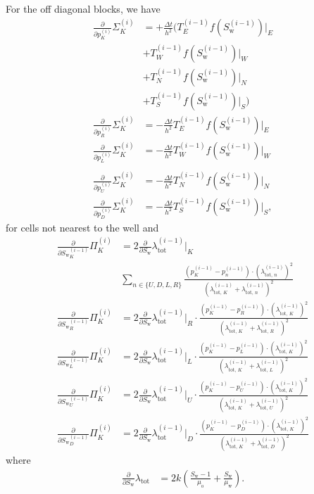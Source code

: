 \documentclass[conference]{IEEEtran}
\newcommand*{\pdiff}[2]{\ensuremath{\frac{\partial}{\partial{#2}}{#1}}}
\begin{document}
For the off diagonal blocks, we have
\begin{align}
\pdiff{\Sigma_K^{(i)}}{p_K^{(i)}} &= +\frac{\Delta t}{h^2} \biggr(T_E^{(i-1)} f(S_\text{w}^{(i-1)})\lvert_E \\&+ T_W^{(i-1)} f(S_\text{w}^{(i-1)})\lvert_W \nonumber\\&+ T_N^{(i-1)} f(S_\text{w}^{(i-1)})\lvert_N \nonumber\\&+T_S^{(i-1)}  f(S_\text{w}^{(i-1)})\lvert_S\biggr) \nonumber\\
\pdiff{\Sigma_K^{(i)}}{p_R^{(i)}} &= -\frac{\Delta t}{h^2}T_E^{(i-1)} f(S_\text{w}^{(i-1)})\lvert_E \\
\pdiff{\Sigma_K^{(i)}}{p_L^{(i)}} &= -\frac{\Delta t}{h^2}T_W^{(i-1)} f(S_\text{w}^{(i-1)})\lvert_W \\\\
\pdiff{\Sigma_K^{(i)}}{p_U^{(i)}} &= -\frac{\Delta t}{h^2}T_N^{(i-1)} f(S_\text{w}^{(i-1)})\lvert_N \\
\pdiff{\Sigma_K^{(i)}}{p_D^{(i)}} &= -\frac{\Delta t}{h^2}T_S^{(i-1)} f(S_\text{w}^{(i-1)})\lvert_S,
\end{align}
for cells not nearest to the well and
\begin{align}
\pdiff{\Pi_K^{(i)}}{{S_\text{w}}_K^{(i-1)}} &= 2 \pdiff{\lambda_\text{tot}^{(i-1)}}{S_\text{w}}\lvert_K\\&\sum_{n\in\{U, D, L, R\}} \frac{(p_K^{(i-1)} - p_n^{(i-1)}) \cdot (\lambda_{\text{tot, }n}^{(i-1)})^2}{(\lambda_{\text{tot, }K}^{(i-1)} + \lambda_{\text{tot, }n}^{(i-1)})^2} \nonumber\\
\pdiff{\Pi_K^{(i)}}{{S_\text{w}}_R^{(i-1)}} &= 2 \pdiff{\lambda_\text{tot}^{(i-1)}}{S_\text{w}}\lvert_R \cdot
\frac{(p_K^{(i-1)} - p_R^{(i-1)}) \cdot (\lambda_{\text{tot, }K}^{(i-1)})^2}{(\lambda_{\text{tot, }K}^{(i-1)} + \lambda_{\text{tot, }R}^{(i-1)})^2} \\
\pdiff{\Pi_K^{(i)}}{{S_\text{w}}_L^{(i-1)}} &= 2 \pdiff{\lambda_\text{tot}^{(i-1)}}{S_\text{w}}\lvert_L \cdot
\frac{(p_K^{(i-1)} - p_L^{(i-1)}) \cdot (\lambda_{\text{tot, }K}^{(i-1)})^2}{(\lambda_{\text{tot, }K}^{(i-1)} + \lambda_{\text{tot, }L}^{(i-1)})^2} \\
\pdiff{\Pi_K^{(i)}}{{S_\text{w}}_U^{(i-1)}} &= 2 \pdiff{\lambda_\text{tot}^{(i-1)}}{S_\text{w}}\lvert_U \cdot
\frac{(p_K^{(i-1)} - p_U^{(i-1)}) \cdot (\lambda_{\text{tot, }K}^{(i-1)})^2}{(\lambda_{\text{tot, }K}^{(i-1)} + \lambda_{\text{tot, }U}^{(i-1)})^2} \\
\pdiff{\Pi_K^{(i)}}{{S_\text{w}}_D^{(i-1)}} &= 2 \pdiff{\lambda_\text{tot}^{(i-1)}}{S_\text{w}}\lvert_D \cdot
\frac{(p_K^{(i-1)} - p_D^{(i-1)}) \cdot (\lambda_{\text{tot, }K}^{(i-1)})^2}{(\lambda_{\text{tot, }K}^{(i-1)} + \lambda_{\text{tot, }D}^{(i-1)})^2}
\end{align}
where
\begin{align}
\pdiff{\lambda_\text{tot}}{S_\text{w}} &= 2k\left(\frac{S_\text{w} - 1}{\mu_\text{o}} + \frac{S_\text{w}}{\mu_\text{w}}\right).
\end{align}
\end{document}
